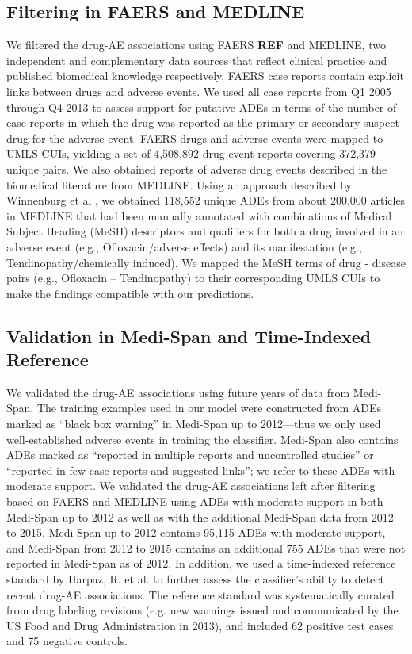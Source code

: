 \subsection{Filtering in FAERS and MEDLINE}
We filtered the drug-AE associations using FAERS \textbf{REF} and
MEDLINE, two independent and complementary data sources that reflect
clinical practice and published biomedical knowledge
respectively. FAERS case reports contain explicit links between drugs
and adverse events. We used all case reports from Q1 2005 through Q4
2013 to assess support for putative ADEs in terms of the number of
case reports in which the drug was reported as the primary or
secondary suspect drug for the adverse event. FAERS drugs and adverse
events were mapped to UMLS CUIs, yielding a set of 4,508,892
drug-event reports covering 372,379 unique pairs. We also obtained
reports of adverse drug events described in the biomedical literature
from MEDLINE. Using an approach described by Winnenburg et al
\cite{Winnenburg2015}, we obtained 118,552 unique ADEs from about
200,000 articles in MEDLINE that had been manually annotated with
combinations of Medical Subject Heading (MeSH) descriptors and
qualifiers for both a drug involved in an adverse event (e.g.,
Ofloxacin/adverse effects) and its manifestation (e.g.,
Tendinopathy/chemically induced). We mapped the MeSH terms of drug -
disease pairs (e.g., Ofloxacin – Tendinopathy) to their corresponding
UMLS CUIs to make the findings compatible with our predictions.

\subsection{Validation in Medi-Span and Time-Indexed Reference}
We validated the drug-AE associations using future years of data from
Medi-Span. The training examples used in our model were constructed
from ADEs marked as “black box warning” in Medi-Span up to 2012—thus
we only used well-established adverse events in training the
classifier. Medi-Span also contains ADEs marked as “reported in
multiple reports and uncontrolled studies” or “reported in few case
reports and suggested links”; we refer to these ADEs with moderate
support.  We validated the drug-AE associations left after filtering
based on FAERS and MEDLINE using ADEs with moderate support in both
Medi-Span up to 2012 as well as with the additional Medi-Span data
from 2012 to 2015.  Medi-Span up to 2012 contains 95,115 ADEs with
moderate support, and Medi-Span from 2012 to 2015 contains an
additional 755 ADEs that were not reported in Medi-Span as of 2012. In
addition, we used a time-indexed reference standard by Harpaz, R. et
al. \cite{Harpaz2013b} to further assess the classifier’s ability to
detect recent drug-AE associations. The reference standard was
systematically curated from drug labeling revisions (e.g. new warnings
issued and communicated by the US Food and Drug Administration in
2013), and included 62 positive test cases and 75 negative controls.

